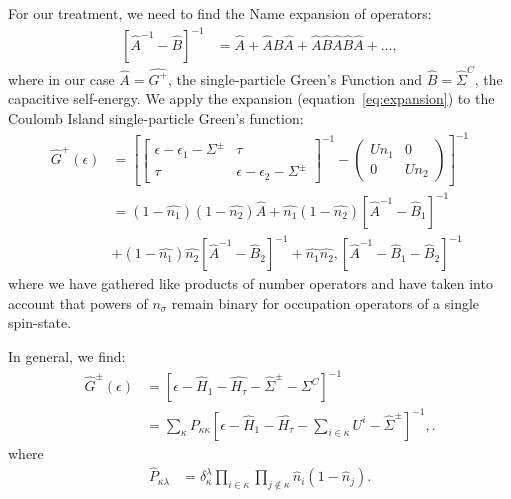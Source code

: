 \documentclass{article}
\newcommand{\red}[1]{ {\color{red} #1}}
\begin{document}
\begin{multicols}{2}
        For our treatment, we need to find the \red{Name} expansion of \red{operators}:
        \begin{align}
        \left[ \hat{A}^{-1} - \hat{B}\right]^{-1} &=\hat{A} + \hat{A}\hat{B}\hat{A} + \hat{A}\hat{B}\hat{A}\hat{B}\hat{A} + \ldots,
        \label{eq:expansion}\end{align}
        where in our case $\hat{A} = \hat{G^+}$, the single-particle Green's Function and $\hat{B}=\hat{\Sigma}^C$, the capacitive self-energy. We apply the expansion (equation~\ref{eq:expansion}) to the Coulomb Island single-particle Green's function:
        \begin{align*}
            \hat{G}^+(\epsilon) &= \left[ \begin{bmatrix} \epsilon - \epsilon_1 - \Sigma^\pm & \tau \\
\tau & \epsilon - \epsilon_2 - \Sigma^\pm \end{bmatrix}^{-1} - \begin{pmatrix} U n_1 & 0 \\ 0 & U n_2 \end{pmatrix} \right]^{-1} \\
            &= (1-\hat{n_1})(1-\hat{n_2}) \hat{A} + \hat{n_1} (1-\hat{n_2}) \left[ \hat{A}^{-1} - \hat{B}_1\right]^{-1} \\& + (1-\hat{n_1}) \hat{n_2} \left[ \hat{A}^{-1} - \hat{B}_2\right]^{-1} + \hat{n_1} \hat{n_2}, \left[\hat{A}^{-1} - \hat{B}_1 - \hat{B}_2 \right]^{-1}
        \end{align*}
        where we have gathered like products of number operators and have taken into account that powers of $n_\sigma$ remain binary for occupation operators of a single spin-state.
        
        In general, we find:
        \begin{align}
        \hat{G}^\pm(\epsilon) &= \left[ \epsilon - \hat{H}_1 - \hat{H_\tau} -\hat{\Sigma}^{\pm} - \Sigma^{C} \right]^{-1} \nonumber\\
        &= \sum_\kappa P_{\kappa\kappa} \left[ \epsilon - \hat{H}_1 - \hat{H_\tau} - \sum_{i \in \kappa}U^i - \hat{\Sigma}^\pm \right]^{-1},  \label{eq:grouping}.
        \end{align}
        where
        \begin{align*}
            \hat{P}_{\kappa\lambda} &= \delta^\lambda_\kappa \prod_{i\in\kappa} \prod_{j\notin\kappa} \hat{n}_i (1-\hat{n}_j).
        \end{align*}
        

\end{multicols}
\end{document}
